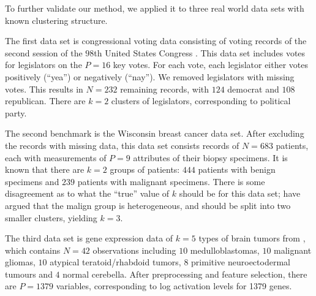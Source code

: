 \documentclass[12pt]{article}
\begin{document}
To further validate our method, we applied it to three real world data sets
with known clustering structure.


The first data set is congressional voting data consisting of voting records
of the second session of the $98$th United States Congress
\citep{schlimmer1987concept}.  This data set includes votes for legislators on
the $P = 16$ key votes.  For each vote, each legislator either votes
positively (``yea'') or negatively (``nay''). We removed legislators with missing
votes.  This results in $N = 232$ remaining records, with $124$ democrat and
$108$ republican. There are $k = 2$ clusters of legislators, corresponding to
political party.


The second benchmark is the \citet{mangasarian1990pattern} Wisconsin breast
cancer data set.  After excluding the records with missing data, this data set
consists records of $N = 683$ patients, each with measurements of $P = 9$
attributes of their biopsy specimens. It is known that there are $k = 2$
groups of patients: $444$ patients with benign specimens and $239$ patients
with malignant specimens. There is some disagreement as to what the ``true''
value of $k$ should be for this data set; \citet{fujita2014non} have argued
that the malign group is heterogeneous, and should be split into two smaller
clusters, yielding $k = 3$.


The third data set is gene expression data of $k = 5$ types of brain tumors
from \citet{pomeroy2002prediction}, which contains $N = 42$ observations
including $10$ medulloblastomas, $10$ malignant gliomas, $10$ atypical
teratoid/rhabdoid tumors, $8$ primitive neuroectodermal tumours and $4$ normal
cerebella. After preprocessing and feature selection, there are $P = 1379$
variables, corresponding to log activation levels for 1379 genes.




\end{document}
